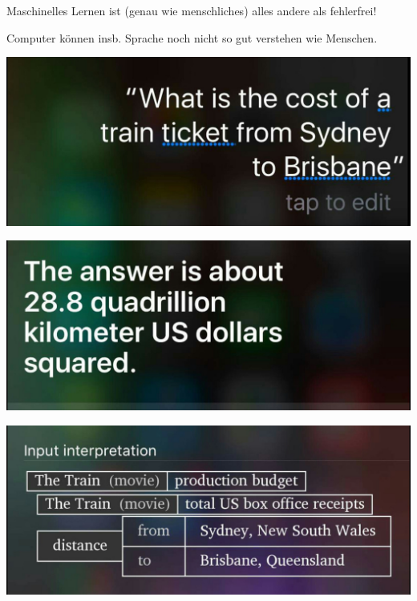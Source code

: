 \documentclass[aspectratio=169,x11names]{beamer}
\begin{document}
\begin{frame}

\begin{multicols}{2}

Maschinelles Lernen ist (genau wie menschliches) alles andere als fehlerfrei!
\bigskip

Computer können insb. Sprache noch nicht so gut verstehen wie Menschen.

\columnbreak

\begin{center}
\includegraphics[scale=0.1]{images/sirifail1.jpg} 
\end{center}
\end{multicols}
\pause
\bigskip

\begin{multicols}{2}

\begin{center}
\includegraphics[scale=0.1]{images/sirifail2.jpg} 
\end{center}

\columnbreak
\pause

\begin{center}
\includegraphics[scale=0.1]{images/sirifail3.jpg} 
\end{center}

\end{multicols}
\end{frame}
\end{document}
